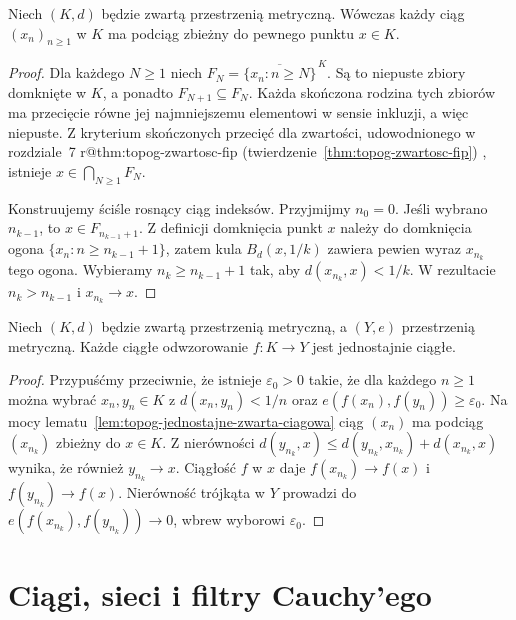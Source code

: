 \begin{lemat}
\label{lem:topog-jednostajne-zwarta-ciagowa}
Niech $(K,d)$ będzie zwartą przestrzenią metryczną.
Wówczas każdy ciąg $(x_n)_{n\ge1}$ w $K$ ma
podciąg zbieżny do pewnego punktu $x\in K$.
\end{lemat}
\begin{proof}
Dla każdego $N\ge1$ niech
$F_N=\overline{\{x_n:n\ge N\}}^{\,K}$.
Są to niepuste zbiory domknięte w $K$,
a ponadto $F_{N+1}\subseteq F_N$.
Każda skończona rodzina tych zbiorów ma
przecięcie równe jej najmniejszemu
elementowi w sensie inkluzji, a więc
niepuste. Z kryterium skończonych przecięć
dla zwartości, udowodnionego w rozdziale~7%
\ifcsname r@thm:topog-zwartosc-fip\endcsname
 (twierdzenie~\ref{thm:topog-zwartosc-fip})%
\fi,
istnieje $x\in\bigcap_{N\ge1}F_N$.

Konstruujemy ściśle rosnący ciąg indeksów.
Przyjmijmy $n_0=0$. Jeśli wybrano
$n_{k-1}$, to $x\in F_{n_{k-1}+1}$.
Z definicji domknięcia punkt $x$
należy do domknięcia ogona
$\{x_n:n\ge n_{k-1}+1\}$, zatem kula
$B_d(x,1/k)$ zawiera pewien wyraz
$x_{n_k}$ tego ogona. Wybieramy
$n_k\ge n_{k-1}+1$ tak, aby
$d(x_{n_k},x)<1/k$. W rezultacie
$n_k>n_{k-1}$ i $x_{n_k}\to x$.
\end{proof}

\begin{twierdzenie}
\label{thm:topog-jednostajne-heine-cantor}
Niech $(K,d)$ będzie zwartą przestrzenią
metryczną, a $(Y,e)$ przestrzenią metryczną.
Każde ciągłe odwzorowanie $f:K\to Y$
jest jednostajnie ciągłe.
\end{twierdzenie}
\begin{proof}
Przypuśćmy przeciwnie, że istnieje
$\varepsilon_0>0$ takie, że dla każdego
$n\ge1$ można wybrać $x_n,y_n\in K$
z $d(x_n,y_n)<1/n$ oraz
$e(f(x_n),f(y_n))\ge\varepsilon_0$.
Na mocy lematu~\ref{lem:topog-jednostajne-zwarta-ciagowa}
ciąg $(x_n)$ ma podciąg $(x_{n_k})$
zbieżny do $x\in K$.
Z nierówności
$d(y_{n_k},x)\le d(y_{n_k},x_{n_k})
  +d(x_{n_k},x)$
wynika, że również $y_{n_k}\to x$.
Ciągłość $f$ w $x$ daje
$f(x_{n_k})\to f(x)$ i $f(y_{n_k})\to f(x)$.
Nierówność trójkąta w $Y$ prowadzi do
$e(f(x_{n_k}),f(y_{n_k}))\to0$,
wbrew wyborowi $\varepsilon_0$.
\end{proof}

\section{Ciągi, sieci i filtry Cauchy'ego}
\label{sec:topog-jednostajne-cauchy}

